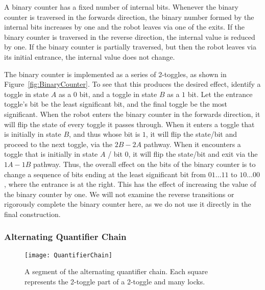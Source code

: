 A binary counter has a fixed number of internal bits.
Whenever the binary counter is traversed in the forwards direction, the binary number
formed by the internal bits increases by one and the robot leaves via one of the exits.
If the binary counter is traversed in the reverse direction, the internal value is reduced by
one. If the binary counter is partially traversed, but then the robot leaves via its initial entrance,
the internal value does not change.


The binary counter is implemented as a series of 2-toggles, as shown in Figure~\ref{fig:BinaryCounter}.
To see that this produces the desired effect, identify a toggle in state $A$ as a $0$ bit, and a toggle in state
$B$ as a $1$ bit. Let the entrance toggle's bit be the least significant bit, and the final toggle be the
most significant. When the robot enters the binary counter in the forwards direction, it will flip
the state of every toggle it passes through. When it enters a toggle that is initially in state $B$, and thus whose
bit is $1$, it will flip the state/bit and proceed to the next toggle, via the $2B - 2A$ pathway. When it
encounters a toggle that is initially in state $A$ / bit $0$, it will flip the state/bit and exit via the $1A - 1B$
pathway. Thus, the overall effect on the bits of the binary counter is to change a sequence of bits ending at the
least significant bit from $01\ldots11$ to $10\ldots00$, where the entrance is at the right.
This has the effect of increasing the value of the binary counter by one.
We will not examine the reverse transitions or rigorously complete the binary counter here, 
as we do not use it directly in the final construction. 

\subsubsection{Alternating Quantifier Chain}
\begin{figure}[h!]
\centering
    \texttt{[image: QuantifierChain]}
    \caption{A segment of the alternating quantifier chain. Each square represents the 2-toggle part of a 2-toggle and many locks.}
    \label{fig:QuantifierChain}
\end{figure}

